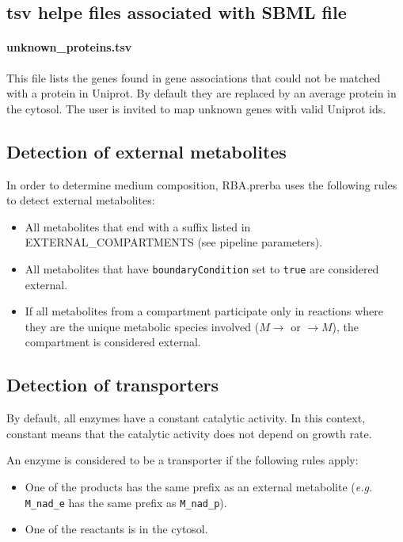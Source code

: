 \subsection{tsv helpe files associated with SBML file}

\paragraph{unknown\_proteins.tsv}
This file lists the genes found in gene associations that could not be
matched with a protein in Uniprot.
By default they are replaced by an average protein in the cytosol.
The user is invited to map unknown genes with valid Uniprot ids.

\subsection{Detection of external metabolites}

In order to determine medium composition,
RBA.prerba uses the following rules to detect external metabolites:
\begin{itemize}
  \item All metabolites that end with a suffix listed in EXTERNAL\_COMPARTMENTS
  (see pipeline parameters).
  \item All metabolites that have \texttt{boundaryCondition} set to \texttt{true}
  are considered external.
  \item If all metabolites from a compartment participate only in reactions where they
  are the unique metabolic species involved
  ($M \rightarrow $ or $\rightarrow M$), the compartment is considered external.
\end{itemize}

\subsection{Detection of transporters}

By default, all enzymes have a constant catalytic activity.
In this context, constant means that the catalytic activity does not depend on growth rate.

An enzyme is considered to be a transporter if the following rules apply:
\begin{itemize}
\item One of the products has the same prefix as an external metabolite
(\textit{e.g.} \texttt{M\_nad\_e} has the same prefix as \texttt{M\_nad\_p}).
\item One of the reactants is in the cytosol.
\end{itemize}

